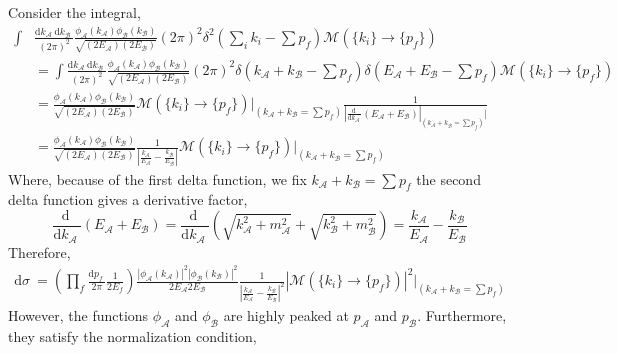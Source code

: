 \documentclass[12pt]{article}
\renewcommand{\d}[1]{ \mathrm{d}#1 \:}
\newcommand{\deriv}[2]{\frac{\d{#1}}{\d{#2}}}
\begin{document}
Consider the integral, 
\begin{align*}
\int & \frac{\d{k_{\mathcal{A}}} \d{k_{\mathcal{B}}}}{(2 \pi)^2} \frac{ \phi_\mathcal{A}(k_\mathcal{A}) \phi_{\mathcal{B}}(k_{\mathcal{B}}) }{ \sqrt{ (2 E_\mathcal{A}) (2 E_\mathcal{B}) }} (2 \pi)^2 \delta^2 \left(\sum_{i} k_i -  \sum p_f \right) \mathcal{M}(\{ k_i \} \to \{p_f \}) 
\\
& = \int \frac{\d{k_{\mathcal{A}}} \d{k_{\mathcal{B}}}}{(2 \pi)^2} \frac{ \phi_\mathcal{A}(k_\mathcal{A}) \phi_{\mathcal{B}}(k_{\mathcal{B}}) }{ \sqrt{ (2 E_\mathcal{A}) (2 E_\mathcal{B}) }} (2 \pi)^2 \delta \left(k_{\mathcal{A}} + k_{\mathcal{B}} -  \sum p_f \right) \delta \left(E_{\mathcal{A}} + E_{\mathcal{B}} -  \sum p_f \right) \mathcal{M}(\{ k_i \} \to \{p_f \}) 
\\
& = \frac{ \phi_\mathcal{A}(k_\mathcal{A}) \phi_{\mathcal{B}}(k_{\mathcal{B}}) }{ \sqrt{ (2 E_\mathcal{A}) (2 E_\mathcal{B}) }} \mathcal{M}(\{ k_i \} \to \{p_f \}) \bigg|_{(k_{\mathcal{A}} + k_{\mathcal{B}} = \sum p_f)} \frac{1}{| \deriv{}{k_{\mathcal{A}}} (E_{\mathcal{A}} + E_{\mathcal{B}})|_{(k_{\mathcal{A}} + k_{\mathcal{B}} = \sum p_f)} |} 
\\
& = \frac{ \phi_\mathcal{A}(k_\mathcal{A}) \phi_{\mathcal{B}}(k_{\mathcal{B}}) }{ \sqrt{ (2 E_\mathcal{A}) (2 E_\mathcal{B}) }} \frac{1}{\left| \frac{k_{\mathcal{A}}}{E_{\mathcal{A}}} - \frac{k_{\mathcal{B}}}{E_{\mathcal{B}}} \right|}  \mathcal{M}(\{ k_i \} \to \{p_f \}) \bigg|_{(k_{\mathcal{A}} + k_{\mathcal{B}} = \sum p_f)} 
\end{align*}
Where, because of the first delta function, we fix $k_{\mathcal{A}} + k_{\mathcal{B}} = \sum p_f$ the second delta function gives a derivative factor,
\[  \deriv{}{k_{\mathcal{A}}} (E_{\mathcal{A}} + E_{\mathcal{B}}) =  \deriv{}{k_{\mathcal{A}}} \left(\sqrt{k_{\mathcal{A}}^2 + m_{\mathcal{A}}^2} + \sqrt{k_{\mathcal{B}}^2 + m_{\mathcal{B}}^2} \right)  = \frac{k_{\mathcal{A}}}{E_{\mathcal{A}}} - \frac{k_{\mathcal{B}}}{E_{\mathcal{B}}}  \]
Therefore, 
\begin{align*}
\d{\sigma} = \left( \prod_{f} \frac{\d{p_f}}{2 \pi} \frac{1}{2 E_f} \right) \frac{ |\phi_\mathcal{A}(k_\mathcal{A})|^2 | \phi_{\mathcal{B}}(k_{\mathcal{B}}) |^2 }{ 2 E_\mathcal{A} 2 E_\mathcal{B} } \frac{1}{\left| \frac{k_{\mathcal{A}}}{E_{\mathcal{A}}} - \frac{k_{\mathcal{B}}}{E_{\mathcal{B}}} \right|^2} | \mathcal{M}(\{ k_i \} \to \{p_f \}) |^2 \bigg|_{(k_{\mathcal{A}} + k_{\mathcal{B}} = \sum p_f)} 
\end{align*}
However, the functions $\phi_{\mathcal{A}}$ and $\phi_{\mathcal{B}}$ are highly peaked at $p_{\mathcal{A}}$ and $p_{\mathcal{B}}$. Furthermore, they satisfy the normalization condition,
\end{document}
